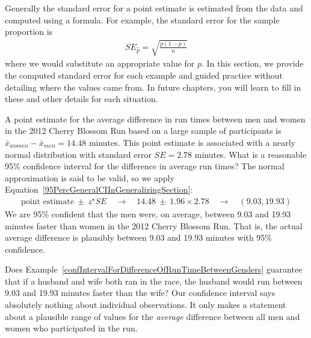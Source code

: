 Generally the standard error for a point estimate is estimated from the data and computed using a formula. For example, the standard error for the sample proportion is
\begin{eqnarray*}
SE_{\hat{p}} = \sqrt{\frac{p(1-p)}{n}}
\end{eqnarray*}
where we would substitute an appropriate value for $p$. In this section, we provide the computed standard error for each example and guided practice without detailing where the values came from. In future chapters, you will learn to fill in these and other details for each situation.

\begin{example}{A point estimate for the average difference in run times between men and women in the 2012 Cherry Blossom Run based on a large sample of participants is $\bar{x}_{women}-\bar{x}_{men}=14.48$ minutes. This point estimate is associated with a nearly normal distribution with standard error $SE=2.78$ minutes. What is a reasonable 95\% confidence interval for the difference in average run times?}
\label{confIntervalForDifferenceOfRunTimeBetweenGenders}
The normal approximation is said to be valid, so we apply Equation~\eqref{95PercGeneralCIInGeneralizingSection}:
\begin{eqnarray*}
\text{point estimate}\ \pm\ z^{\star} SE
	\quad\rightarrow\quad 14.48\ \pm\ 1.96\times 2.78
	\quad\rightarrow\quad (9.03, 19.93)
\end{eqnarray*}
We are 95\% confident that the men were, on average, between 9.03 and 19.93 minutes faster than women in the 2012 Cherry Blossom Run. That is, the actual average difference is plausibly between 9.03 and 19.93 minutes with 95\% confidence.
\end{example}


\begin{example}{Does Example~\ref{confIntervalForDifferenceOfRunTimeBetweenGenders} guarantee that if a husband and wife both ran in the race, the husband would run between 9.03 and 19.93 minutes faster than the wife?}
Our confidence interval says absolutely nothing about individual observations. It only makes a statement about a plausible range of values for the \emph{average} difference between all men and women who participated in the run.
\end{example}

